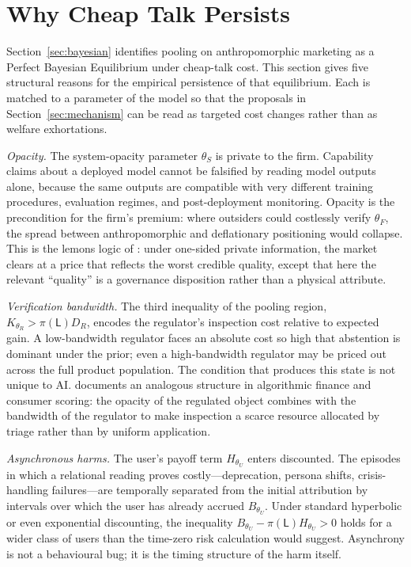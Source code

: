 \section{Why Cheap Talk Persists}
\label{sec:cheap-talk}

Section~\ref{sec:bayesian} identifies pooling on anthropomorphic marketing as a Perfect Bayesian Equilibrium under cheap-talk cost. This section gives five structural reasons for the empirical persistence of that equilibrium. Each is matched to a parameter of the model so that the proposals in Section~\ref{sec:mechanism} can be read as targeted cost changes rather than as welfare exhortations.

\emph{Opacity.} The system-opacity parameter $\theta_S$ is private to the firm. Capability claims about a deployed model cannot be falsified by reading model outputs alone, because the same outputs are compatible with very different training procedures, evaluation regimes, and post-deployment monitoring. Opacity is the precondition for the firm's premium: where outsiders could costlessly verify $\theta_F$, the spread between anthropomorphic and deflationary positioning would collapse. This is the lemons logic of \citet{akerlof1970}: under one-sided private information, the market clears at a price that reflects the worst credible quality, except that here the relevant ``quality'' is a governance disposition rather than a physical attribute.

\emph{Verification bandwidth.} The third inequality of the pooling region, $K_{\theta_R}>\pi(\mathsf{L})D_R$, encodes the regulator's inspection cost relative to expected gain. A low-bandwidth regulator faces an absolute cost so high that abstention is dominant under the prior; even a high-bandwidth regulator may be priced out across the full product population. The condition that produces this state is not unique to AI. \citet{pasquale2015} documents an analogous structure in algorithmic finance and consumer scoring: the opacity of the regulated object combines with the bandwidth of the regulator to make inspection a scarce resource allocated by triage rather than by uniform application.

\emph{Asynchronous harms.} The user's payoff term $H_{\theta_U}$ enters discounted. The episodes in which a relational reading proves costly---deprecation, persona shifts, crisis-handling failures---are temporally separated from the initial attribution by intervals over which the user has already accrued $B_{\theta_U}$. Under standard hyperbolic or even exponential discounting, the inequality $B_{\theta_U}-\pi(\mathsf{L})H_{\theta_U}>0$ holds for a wider class of users than the time-zero risk calculation would suggest. Asynchrony is not a behavioural bug; it is the timing structure of the harm itself.

